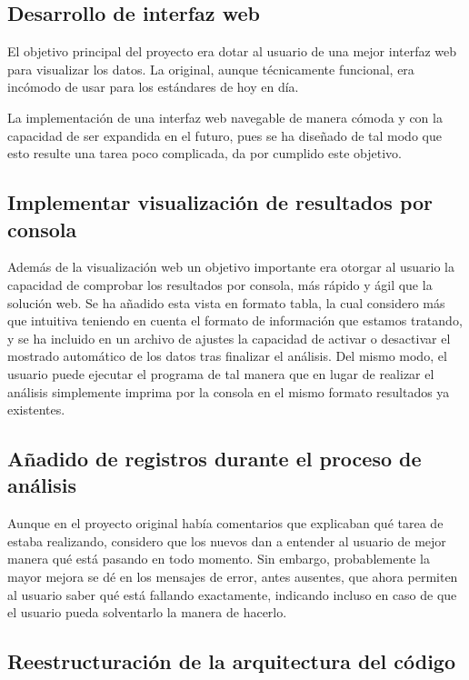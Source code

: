 \documentclass[a4paper, 12pt]{book}
\begin{document}
\subsection{Desarrollo de interfaz web}

El objetivo principal del proyecto era dotar al usuario de una mejor interfaz web para visualizar los datos. La original, aunque técnicamente funcional, era incómodo de usar para los estándares de hoy en día.

La implementación de una interfaz web navegable de manera cómoda y con la capacidad de ser expandida en el futuro, pues se ha diseñado de tal modo que esto resulte una tarea poco complicada, da por cumplido este objetivo.

\subsection{Implementar visualización de resultados por consola}

Además de la visualización web un objetivo importante era otorgar al usuario la capacidad de comprobar los resultados por consola, más rápido y ágil que la solución web. Se ha añadido esta vista en formato tabla, la cual considero más que intuitiva teniendo en cuenta el formato de información que estamos tratando, y se ha incluido en un archivo de ajustes la capacidad de activar o desactivar el mostrado automático de los datos tras finalizar el análisis. Del mismo modo, el usuario puede ejecutar el programa de tal manera que en lugar de realizar el análisis simplemente imprima por la consola en el mismo formato resultados ya existentes. 

\subsection{Añadido de registros durante el proceso de análisis}

Aunque en el proyecto original había comentarios que explicaban qué tarea de estaba realizando, considero que los nuevos dan a entender al usuario de mejor manera qué está pasando en todo momento. Sin embargo, probablemente la mayor mejora se dé en los mensajes de error, antes ausentes, que ahora permiten al usuario saber qué está fallando exactamente, indicando incluso en caso de que el usuario pueda solventarlo la manera de hacerlo.

\subsection{Reestructuración de la arquitectura del código}
\end{document}
